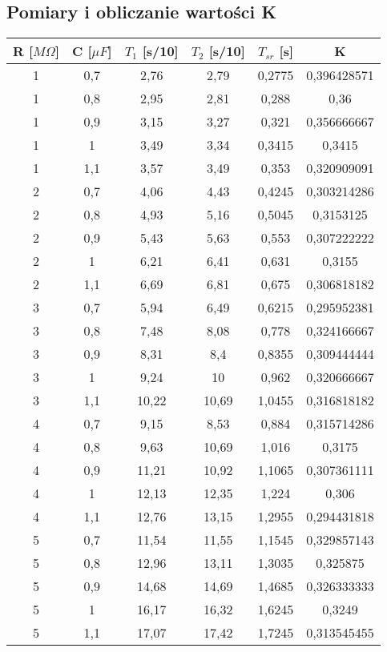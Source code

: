 \documentclass[polish,a4paper]{article}
\begin{document}
\subsection{Pomiary i obliczanie wartości K}
\begin{table}[H]
\centering
\begin{tabular}{|c|c|c|c|c|c|}
\hline
R [$M\Omega$] & C [$\mu F$] & $T_1$ [s/10] & $T_2$ [s/10] & $T_{sr}$ [s] & K\\
\hline 
1&	0,7& 2,76&	2,79&	0,2775&  	0,396428571 \\
1&	0,8& 2,95&	2,81&	0,288&  	0,36\\
1&	0,9& 3,15&	3,27&	0,321&  	0,356666667 \\
1&	1	&3,49&	3,34&	0,3415& 	0,3415\\
1&	1,1	&3,57&	3,49&	0,353&  	0,320909091 \\
2&	0,7	&4,06&	4,43&	0,4245& 	0,303214286 \\
2&	0,8	&4,93&	5,16&	0,5045& 	0,3153125 \\
2&	0,9	&5,43&	5,63&	0,553&  	0,307222222 \\
2&	1	&6,21&	6,41&	0,631&  	0,3155 \\
2&	1,1	&6,69&	6,81&	0,675& 	    0,306818182 \\
3&	0,7	&5,94&	6,49&	0,6215& 	0,295952381 \\
3&	0,8	&7,48&	8,08&	0,778&  	0,324166667 \\
3&	0,9	&8,31&	8,4&	0,8355& 	0,309444444 \\
3&	1	&9,24&	10& 	0,962&  	0,320666667 \\
3&	1,1	&10,22&	10,69& 	1,0455& 	0,316818182 \\
4&	0,7	&9,15&	8,53& 	0,884&  	0,315714286 \\
4&	0,8	&9,63&	10,69& 	1,016&  	0,3175 \\
4&	0,9	&11,21&	10,92& 	1,1065& 	0,307361111 \\
4&	1	&12,13&	12,35& 	1,224&  	0,306 \\
4&	1,1	&12,76&	13,15& 	1,2955& 	0,294431818 \\
5&	0,7	&11,54&	11,55& 	1,1545& 	0,329857143 \\
5&	0,8	&12,96&	13,11& 	1,3035& 	0,325875 \\
5&	0,9	&14,68&	14,69& 	1,4685& 	0,326333333 \\
5&	1	&16,17&	16,32& 	1,6245& 	0,3249 \\
5&	1,1	&17,07&	17,42& 	1,7245& 	0,313545455 \\
\hline
\end{tabular}
\end{table}
\end{document}
